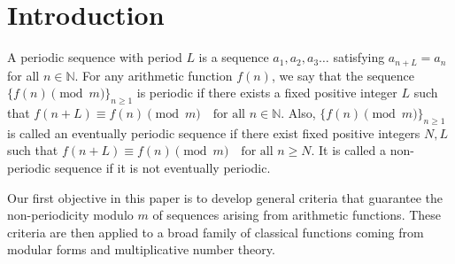 \documentclass[12pt,reqno]{amsart}
\begin{document}
\tableofcontents
\section{Introduction}
A periodic sequence with period $L$ is a sequence $a_1,a_2,a_3\ldots$ satisfying $a_{n+L}=a_{n}$ for all $n\in \mathbb{N}$. For any arithmetic function $f(n)$, we say that the sequence $\{f(n)\pmod{m}\}_{n\geq1}$ is periodic if there exists a fixed positive integer $L$ such that $f(n+L)\equiv f(n) \pmod{m}\quad \text{for all~}n\in \mathbb{N}$. Also, $\{f(n) \pmod{m}\}_{n\geq 1}$ is called an eventually periodic sequence if there exist fixed positive integers $N,L$ such that $f(n+L)\equiv f(n) \pmod{m}\quad \text{for all~}n\geq N$. It is called a non-periodic sequence if it is not eventually periodic. 

Our first objective in this paper is to develop general criteria that guarantee the non-periodicity modulo $m$ of sequences arising from arithmetic functions. These criteria are then applied to a broad family of classical functions coming from modular forms and multiplicative number theory.
\end{document}
